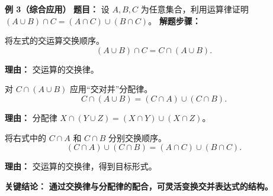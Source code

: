 \begin{examplebox}
	\medskip
	\textbf{\textcolor{CExample}{例 3（综合应用）}}
	\textbf{\textcolor{CExample}{题目：}}
	设 $A,B,C$ 为任意集合，利用运算律证明 $(A\cup B)\cap C = (A\cap C)\cup(B\cap C)$。
	\textbf{\textcolor{CExample}{解题步骤：}}
	\begin{description}[style=nextline, leftmargin=2.8em, labelsep=0.5em, itemsep=0.45em]
		\item[\textbf{第一步（交换律）：}]
			将左式的交运算交换顺序。
			\[
				(A\cup B)\cap C = C\cap(A\cup B).
			\]
			\par\textbf{理由：} 交运算的交换律。
		\item[\textbf{第二步（分配律）：}]
			对 $C\cap(A\cup B)$ 应用“交对并”分配律。
			\[
				C\cap(A\cup B) = (C\cap A)\cup(C\cap B).
			\]
			\par\textbf{理由：} 分配律 $X\cap(Y\cup Z)=(X\cap Y)\cup(X\cap Z)$。
		\item[\textbf{第三步（交换律回位）：}]
			将右式中的 $C\cap A$ 和 $C\cap B$ 分别交换顺序。
			\[
				(C\cap A)\cup(C\cap B) = (A\cap C)\cup(B\cap C).
			\]
			\par\textbf{理由：} 交运算的交换律，得到目标形式。
	\end{description}
	\textbf{\textcolor{CExample}{关键结论：}}
	\textbf{通过交换律与分配律的配合，可灵活变换交并表达式的结构。}
\end{examplebox}
